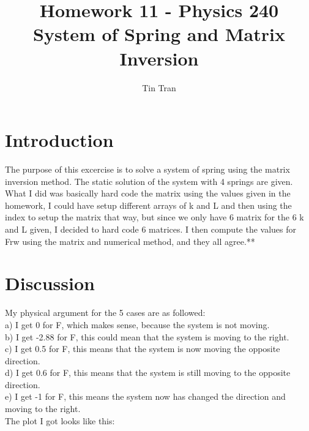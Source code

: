 \documentclass{article}
\begin{document}
\title{Homework 11 - Physics 240\\
		System of Spring and Matrix Inversion}
\author{Tin Tran}

\maketitle

\section{Introduction}
The purpose of this excercise is to solve a system of spring using the matrix inversion method. The static solution of the system with 4 springs are given.\\
\indent What I did was basically hard code the matrix using the values given in the homework, I could have setup different arrays of k and L and then using the index to setup the matrix that way, but since we only have 6 matrix for the 6 k and L given, I decided to hard code 6 matrices. I then compute the values for Frw using the matrix and numerical method, and they all agree.**
\section{Discussion}
My physical argument for the 5 cases are as followed:\\
a) I get 0 for F, which makes sense, because the system is not moving.\\
b) I get -2.88 for F, this could mean that the system is moving to the right.\\
c) I get 0.5 for F, this means that the system is now moving the opposite direction.\\
d) I get 0.6 for F, this means that the system is still moving to the opposite direction.\\
e) I get -1 for F, this means the system now has changed the direction and moving to the right.\\

The plot I got looks like this:

\begin{figure}[H]
\end{figure}
\end{document}
